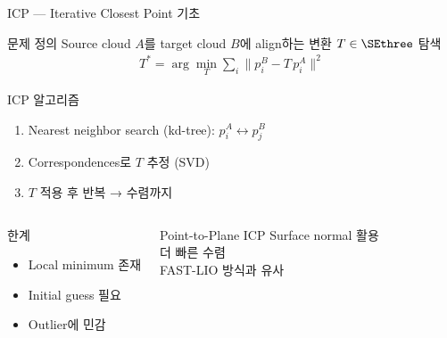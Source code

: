 \begin{frame}{ICP — Iterative Closest Point 기초}
  \begin{block}{문제 정의}
    Source cloud $A$를 target cloud $B$에 align하는 변환 $T \in \SEthree$ 탐색
    \begin{align*}
      T^* = \arg\min_T \sum_i \|p_i^B - T\,p_i^A\|^2
    \end{align*}
  \end{block}
  \pause
  \begin{block}{ICP 알고리즘}
    \begin{enumerate}
      \item Nearest neighbor search (kd-tree): $p_i^A \leftrightarrow p_j^B$
      \item Correspondences로 $T$ 추정 (SVD)
      \item $T$ 적용 후 반복 → 수렴까지
    \end{enumerate}
  \end{block}
  \pause
  \begin{columns}
    \begin{alertblock}{한계}
      \begin{itemize}
        \item Local minimum 존재
        \item Initial guess 필요
        \item Outlier에 민감
      \end{itemize}
    \end{alertblock}
    \begin{exampleblock}{Point-to-Plane ICP}
      Surface normal 활용\\
      더 빠른 수렴\\
      FAST-LIO 방식과 유사
    \end{exampleblock}
  \end{columns}
\end{frame}

